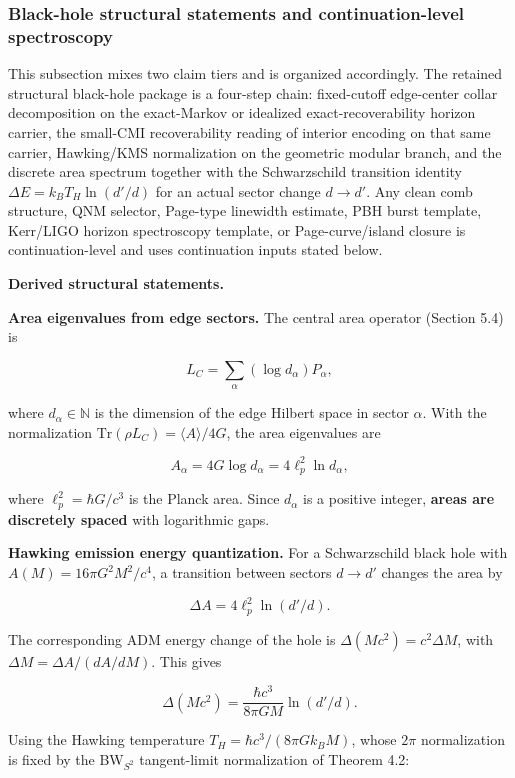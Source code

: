 \subsubsection{Black-hole structural statements and continuation-level spectroscopy}\label{511-discrete-horizon-area-spectrum-and-hawking-emission-established}

This subsection mixes two claim tiers and is organized accordingly. The retained structural
black-hole package is a four-step chain: fixed-cutoff edge-center collar decomposition on the
exact-Markov or idealized exact-recoverability horizon carrier, the small-CMI recoverability
reading of interior encoding on that same carrier, Hawking/KMS normalization on the geometric
modular branch, and the discrete area spectrum together with the Schwarzschild transition identity
\(\Delta E = k_B T_H \ln(d'/d)\) for an actual sector change \(d \to d'\). Any clean comb
structure, QNM selector, Page-type linewidth estimate, PBH burst template, Kerr/LIGO horizon
spectroscopy template, or Page-curve/island closure is continuation-level and uses continuation
inputs stated below.

\textbf{Derived structural statements.}

\textbf{Area eigenvalues from edge sectors.} The central area operator (Section 5.4) is

\[
L_C = \sum_\alpha (\log d_\alpha) P_\alpha,
\]

where \(d_\alpha \in \mathbb{N}\) is the dimension of the edge Hilbert space in sector \(\alpha\). With the normalization \(\mathrm{Tr}(\rho L_C) = \langle A
\rangle / 4G\), the area eigenvalues are

\[
A_\alpha = 4G \log d_\alpha = 4\ell_p^2 \ln d_\alpha,
\]

where \(\ell_p^2 = \hbar G/c^3\) is the Planck area. Since \(d_\alpha\) is a positive integer, \textbf{areas are discretely spaced} with logarithmic gaps.

\textbf{Hawking emission energy quantization.} For a Schwarzschild black hole with \(A(M) = 16\pi G^2 M^2/c^4\), a transition between sectors \(d \to d'\) changes the area by

\[
\Delta A = 4\ell_p^2 \ln(d'/d).
\]

The corresponding ADM energy change of the hole is \(\Delta(Mc^2) = c^2 \Delta M\), with \(\Delta M = \Delta A / (dA/dM)\). This gives

\[
\Delta(Mc^2) = \frac{\hbar c^3}{8\pi G M} \ln(d'/d).
\]

Using the Hawking temperature \(T_H = \hbar c^3 / (8\pi G k_B M)\), whose \(2\pi\) normalization is fixed by the BW\(_{S^2}\) tangent-limit normalization of Theorem 4.2:

